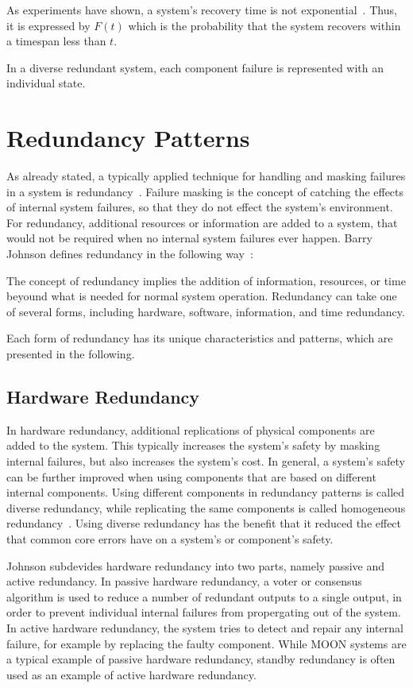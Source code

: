 As experiments have shown, a system's recovery time is not exponential~\cite{TheoryAndPracticeReliableSystem}.
Thus, it is expressed by $F(t)$ which is the probability that the system recovers within a timespan less than $t$.

In a diverse redundant system, each component failure is represented with an individual state.

\section{Redundancy Patterns}
\label{sec:redundancyPatterns}
As already stated, a typically applied technique for handling and masking failures in a system is redundancy~\cite{TanenbaumSteen07}.
Failure masking is the concept of catching the effects of internal system failures, so that they do not effect the system's environment.
For redundancy, additional resources or information are added to a system, that would not be required when no internal system failures ever happen.
Barry Johnson defines redundancy in the following way~\cite{BarryFaultToleranceAnalysis}:
\begin{definition}
The concept of redundancy implies the addition of information, resources, or time beyound what is needed for normal system operation.
Redundancy can take one of several forms, including hardware, software, information, and time redundancy.
\end{definition}

Each form of redundancy has its unique characteristics and patterns, which are presented in the following.

\subsection{Hardware Redundancy}
In hardware redundancy, additional replications of physical components are added to the system.
This typically increases the system's safety by masking internal failures, but also increases the system's cost.
In general, a system's safety can be further improved when using components that are based on different internal components.
Using different components in redundancy patterns is called diverse redundancy, while replicating the same components is called homogeneous redundancy~\cite{HomogeneousRedundancyOuzineb}.
Using diverse redundancy has the benefit that it reduced the effect that common core errors have on a system's or component's safety.

Johnson subdevides hardware redundancy into two parts, namely passive and active redundancy.
In passive hardware redundancy, a voter or consensus algorithm is used to reduce a number of redundant outputs to a single output, in order to prevent individual internal failures from propergating out of the system.
In active hardware redundancy, the system tries to detect and repair any internal failure, for example by replacing the faulty component.
While \gls*{MOON} systems are a typical example of passive hardware redundancy, standby redundancy is often used as an example of active hardware redundancy.

